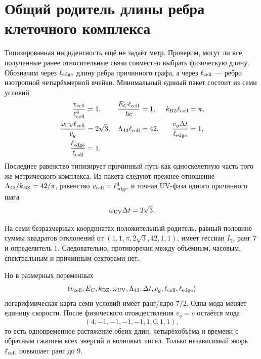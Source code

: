 \chapter{Общий родитель длины ребра клеточного комплекса}
\label{ch:v10-nonequilibrium-bath-edge-length-common-parent}

Типизированная инцидентность ещё не задаёт метр. Проверим, могут ли все
полученные ранее относительные связи совместно выбрать физическую длину.
Обозначим через $\ell_{\rm edge}$ длину ребра причинного графа, а через
$\ell_{\rm cell}$ --- ребро изотропной четырёхмерной ячейки. Минимальный
единый пакет состоит из семи условий
\begin{align}
 \frac{v_{\rm cell}}{\ell_{\rm cell}^4}&=1,&
 \frac{E_C\ell_{\rm cell}}{\hbar c}&=1,&
 k_{\rm BZ}\ell_{\rm cell}&=\pi,\\
 \frac{\omega_{\rm UV}\ell_{\rm cell}}{v_g}&=2\sqrt3,&
 \Lambda_{43}\ell_{\rm cell}&=42,&
 \frac{v_g\Delta t}{\ell_{\rm edge}}&=1,\\
 \frac{\ell_{\rm edge}}{\ell_{\rm cell}}&=1.&&
\end{align}
Последнее равенство типизирует причинный путь как односкелетную часть того же
метрического комплекса. Из пакета следуют прежнее отношение
$\Lambda_{43}/k_{\rm BZ}=42/\pi$, равенство
$v_{\rm cell}=\ell_{\rm edge}^4$ и точная UV-фаза одного причинного шага
\begin{equation}
 \omega_{\rm UV}\Delta t=2\sqrt3.
\end{equation}

На семи безразмерных координатах положительный родитель, равный половине
суммы квадратов отклонений от
$(1,1,\pi,2\sqrt3,42,1,1)$, имеет гессиан $I_7$, ранг $7$ и определитель
$1$. Следовательно, противоречия между объёмным, часовым, спектральным и
причинным секторами нет.

Но в размерных переменных
\begin{equation}
 (v_{\rm cell},E_C,k_{\rm BZ},\omega_{\rm UV},\Lambda_{43},
 \Delta t,v_g,\ell_{\rm cell},\ell_{\rm edge})
\end{equation}
логарифмическая карта семи условий имеет ранг/ядро $7/2$. Одна мода меняет
единицу скорости. После физического отождествления $v_g=c$ остаётся мода
\begin{equation}
 (4,-1,-1,-1,-1,1,0,1,1),
\end{equation}
то есть одновременное растяжение обеих длин, четырёхобъёма и времени с
обратным сжатием всех энергий и волновых чисел. Только независимый якорь
$\ell_{\rm cell}$ повышает ранг до $9$.

